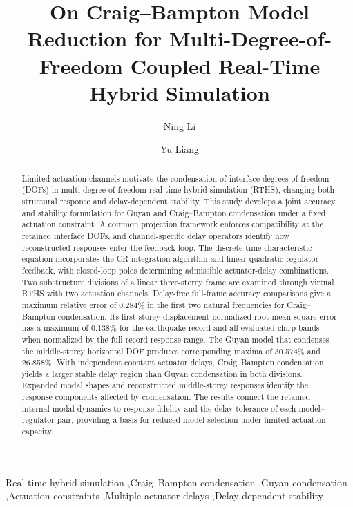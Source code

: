\documentclass[a4paper,fleqn,review,12pt]{cas-sc}
\begin{document}
\let\WriteBookmarks\relax
\def\floatpagepagefraction{1}
\def\textpagefraction{.001}

\title[mode=title]{On Craig--Bampton Model Reduction for Multi-Degree-of-Freedom Coupled Real-Time Hybrid Simulation}

\author{Ning Li}
\author{Yu Liang}

\begin{abstract}
Limited actuation channels motivate the condensation of interface degrees of freedom (DOFs) in multi-degree-of-freedom real-time hybrid simulation (RTHS), changing both structural response and delay-dependent stability. This study develops a joint accuracy and stability formulation for Guyan and Craig--Bampton condensation under a fixed actuation constraint. A common projection framework enforces compatibility at the retained interface DOFs, and channel-specific delay operators identify how reconstructed responses enter the feedback loop. The discrete-time characteristic equation incorporates the CR integration algorithm and linear quadratic regulator feedback, with closed-loop poles determining admissible actuator-delay combinations. Two substructure divisions of a linear three-storey frame are examined through virtual RTHS with two actuation channels. Delay-free full-frame accuracy comparisons give a maximum relative error of 0.284\% in the first two natural frequencies for Craig--Bampton condensation. Its first-storey displacement normalized root mean square error has a maximum of 0.138\% for the earthquake record and all evaluated chirp bands when normalized by the full-record response range. The Guyan model that condenses the middle-storey horizontal DOF produces corresponding maxima of 30.574\% and 26.858\%. With independent constant actuator delays, Craig--Bampton condensation yields a larger stable delay region than Guyan condensation in both divisions. Expanded modal shapes and reconstructed middle-storey responses identify the response components affected by condensation. The results connect the retained internal modal dynamics to response fidelity and the delay tolerance of each model--regulator pair, providing a basis for reduced-model selection under limited actuation capacity.

\end{abstract}

\begin{keywords}
	\raggedright
	Real-time hybrid simulation
	\sep Craig--Bampton condensation
	\sep Guyan condensation
	\sep Actuation constraints
	\sep Multiple actuator delays
	\sep Delay-dependent stability
\end{keywords}
\end{document}
